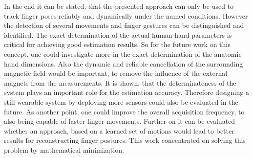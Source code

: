In the end it can be stated, that the presented approach can only be used to track finger poses reliably and dynamically under the named conditions. However the detection of several movements and finger gestures can be distinguished and identified. The exact determination of the actual human hand parameters is critical for achieving good estimation results. So for the future work on this concept, one could investigate more in the exact determination of the anatomic hand dimensions. Also the dynamic and reliable cancellation of the surrounding magnetic field would be important, to remove the influence of the external magnets from the measurements. It is shown, that the determinateness of the system plays an important role for the estimation accuracy. Therefore designing a still wearable system by deploying more sensors could also be evaluated in the future. As another point, one could improve the overall acquisition frequency, to also being capable of faster finger movements. Further on it can be evaluated whether an approach, based on a learned set of motions would lead to better results for reconstructing finger postures. This work concentrated on solving this problem by mathematical minimization.

 


